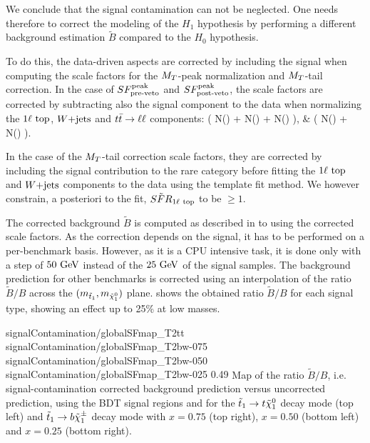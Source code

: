     We conclude that the signal contamination can not be neglected. One needs
    therefore to correct the modeling of the $H_1$ hypothesis by performing a
    different background estimation $\tilde{B}$ compared to the $H_0$
    hypothesis.

    To do this, the data-driven aspects are corrected by including the signal
    when computing the scale factors for the $M_T$-peak normalization and
    $M_T$-tail correction. In the case of $SF_{\text{pre-veto}}^{\text{peak}}$ and $SF_{\text{post-veto}}^{\text{peak}}$, the scale
    factors are corrected by subtracting also the signal component to the data
    when normalizing the $1\ell~\text{top}$, $\text{$W$+jets}$ and $t\bar{t} \rightarrow \ell \ell$
    components:
    {
        \SFpreTilde
        \left(
                 {N(\oneLeptonTop) + N(\Wjets) + N(\diLeptonTop)}
        \right),
     }
     {
        \SFpostTilde
        & 
        \left(
                 {N(\oneLeptonTop) + N(\Wjets)}
        \right).
    }

    In the case of the $M_T$-tail correction scale factors, they are corrected
    by including the signal contribution to the rare category before fitting the
    $1\ell~\text{top}$ and $\text{$W$+jets}$ components to the data using the template fit
    method. We however constrain, a posteriori to the fit,
    $\tilde{SFR}_{1\ell~\text{top}}$ to be $\geq 1$.

    The corrected background $\tilde{B}$ is computed as described in
     to  using
    the corrected scale factors. As the correction depends on the signal, it has
    to be performed on a per-benchmark basis. However, as it is a CPU intensive
    task, it is done only with a step of $50 ~\text{GeV}$ instead of the $25 ~\text{GeV}$ of
    the signal samples. The background prediction for other benchmarks is
    corrected using an interpolation of the ratio $\tilde{B}/B$ across the
    $(m_{\tilde{t}_1},m_{\tilde{\chi}_1^0})$ plane.
     shows the obtained ratio $\tilde{B}/B$
    for each signal type, showing an effect up to 25\% at low masses.

                      {signalContamination/globalSFmap_T2tt}
                      {signalContamination/globalSFmap_T2bw-075}
                      {signalContamination/globalSFmap_T2bw-050}
                      {signalContamination/globalSFmap_T2bw-025}
                      {0.49}
                      {Map of the ratio $\tilde{B}/B$, i.e. signal-contamination
                      corrected background prediction versus uncorrected
                      prediction, using the BDT signal regions and for the
                      $\tilde{t}_1 \rightarrow t \tilde{\chi}_1^0$ decay mode (top left)
                      and $\tilde{t}_1 \rightarrow b \tilde{\chi}_1^\pm$ decay mode with
                      $x=0.75$ (top right), $x=0.50$ (bottom left) and $x=0.25$
                      (bottom right).}

